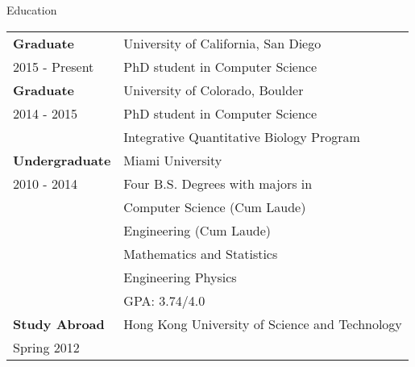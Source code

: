 \documentclass{resume} %
\begin{document}
\begin{rSection}{Education}
  \begin{tabular}{ll}
    \textbf{Graduate}    & University of California, San Diego  \\
    2015 - Present  & PhD student in Computer Science \\
    \textbf{Graduate}    & University of Colorado, Boulder \\
    2014 - 2015  & PhD student in Computer Science \\
                    & Integrative Quantitative Biology Program \\
    \textbf{Undergraduate}    & Miami University \\
    2010 - 2014   & Four B.S. Degrees with majors in\\
    & Computer Science (Cum Laude)\\
    & Engineering (Cum Laude)\\
    & Mathematics and Statistics \\
    & Engineering Physics \\
    & GPA: 3.74/4.0 \\
    \textbf{Study Abroad} &  Hong Kong University of Science and Technology   \\
    Spring 2012 \\
  \end{tabular}
\end{rSection}
\end{document}

